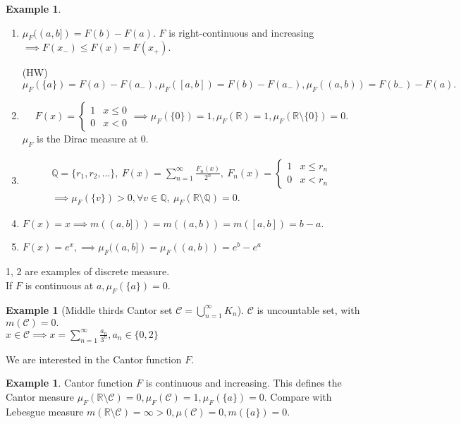 \documentclass{report}
\newcommand{\R}{\mathbb{R}}
\newcommand{\Q}{\mathbb{Q}}
\theoremstyle{definition}
\newtheorem{example}[theorem]{Example}
\theoremstyle{remark}
\newcommand{\fnl}{\parbox[t]{0\linewidth}{}}
\begin{document}
\begin{example}
\begin{enumerate}
\item $\mu_F((a, b]) = F(b) - F(a)$. $F$ is right-continuous and increasing $\implies F(x_-) \leq F(x) = F(x_+)$.

(HW) $\mu_F(\{a\}) = F(a) - F(a_-), \mu_F([a, b]) = F(b) - F(a_-), \mu_F((a, b)) = F(b_-) - F(a).$

\item
\[F(x) = \begin{cases}
1 & x \leq 0 \\ 0 & x < 0
\end{cases} \implies \mu_F(\{0\}) = 1, \mu_F(\R) = 1, \mu_F(\R \setminus \{0\}) = 0.
\]
$\mu_F$ is the Dirac measure at $0$.

\item
\begin{multline*}
\Q = \{r_1, r_2, \ldots\},\ F(x) = \sum_{n=1}^\infty \frac{F_n(x)}{2^n},\ F_n(x) = \begin{cases}
1 & x \leq r_n \\ 0 & x < r_n
\end{cases} \\
\implies \mu_F(\{v\}) > 0, \forall v \in \Q,\ \mu_F(\R \setminus \Q) = 0.
\end{multline*}

\item
$F(x) = x \implies m((a, b])) = m((a, b)) = m([a, b]) = b - a.$

\item
$F(x) = e^x, \implies \mu_F((a, b]) = \mu_F((a, b)) = e^b - e^a$
\end{enumerate}
1, 2 are examples of discrete measure. \\
If $F$ is continuous at $a, \mu_F(\{a\}) = 0$.
\end{example}

\begin{example}
[Middle thirds Cantor set $\mathcal{C} = \bigcup_{n=1}^\infty K_n$]\fnl

$\mathcal{C}$ is uncountable set, with $m(\mathcal{C}) = 0.$\\
$x \in \mathcal{C} \implies x = \sum_{n=1}^\infty \frac{a_n}{3^n}, a_n \in \{0, 2\}$

We are interested in the Cantor function $F$.
\end{example}

\begin{example}
Cantor function $F$ is continuous and increasing.
This defines the Cantor measure $\mu_F(\R \setminus \mathcal{C}) = 0, \mu_F(\mathcal{C}) = 1, \mu_F(\{a\}) = 0.$ Compare with Lebesgue measure $m(\R \setminus \mathcal{C}) = \infty > 0, \mu(\mathcal{C}) = 0, m(\{a\}) = 0$.
\end{example}
\end{document}
